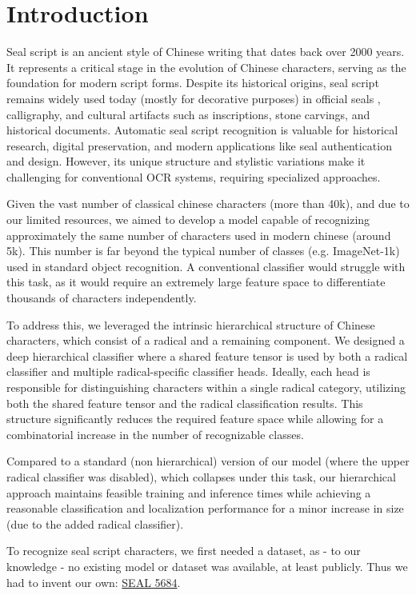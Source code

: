 \section{Introduction}
\label{sec:introduction}

Seal script \cite{WikipediaSealScript} is an ancient style of Chinese writing that dates back over 2000 years. It represents a critical stage in the evolution of Chinese characters, serving as the foundation for modern script forms. Despite its historical origins, seal script remains widely used today (mostly for decorative purposes) in official seals \cite{WikipediaSeals}, calligraphy, and cultural artifacts such as inscriptions, stone carvings, and historical documents.
Automatic seal script recognition is valuable for historical research, digital preservation, and modern applications like seal authentication and design. However, its unique structure and stylistic variations make it challenging for conventional OCR systems, requiring specialized approaches.

Given the vast number of classical chinese characters (more than 40k), and due to our limited resources, we aimed to develop a model capable of recognizing approximately the same number of characters used in modern chinese (around 5k). This number is far beyond the typical number of classes (e.g. ImageNet-1k) used in standard object recognition. A conventional classifier would struggle with this task, as it would require an extremely large feature space to differentiate thousands of characters independently.

To address this, we leveraged the intrinsic hierarchical structure of Chinese characters, which consist of a radical and a remaining component. We designed a deep hierarchical classifier where a shared feature tensor is used by both a radical classifier and multiple radical-specific classifier heads. Ideally, each head is responsible for distinguishing characters within a single radical category, utilizing both the shared feature tensor and the radical classification results. This structure significantly reduces the required feature space while allowing for a combinatorial increase in the number of recognizable classes.

Compared to a standard (non hierarchical) version of our model (where the upper radical classifier was disabled), which collapses under this task, our hierarchical approach maintains feasible training and inference times while achieving a reasonable classification and localization performance for a minor increase in size (due to the added radical classifier).

To recognize seal script characters, we first needed a dataset, as - to our knowledge - no existing model or dataset was available, at least publicly. Thus we had to invent our own: \href{https://www.kaggle.com/datasets/emanuelemessina/seal-5684/data}{SEAL 5684}.



